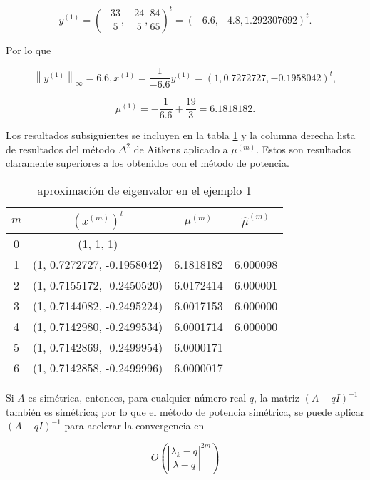 \documentclass[12pt, a4paper]{article}
\numberwithin{subsection}{section} %
\begin{document}
            $$y^{(1)} = (-\frac{33}{5},-\frac{24}{5},\frac{84}{65})^t = (-6.6,-4.8, 1.292307692)^t.$$
        
            Por lo que
        
            $$\left\|y^{(1)}\right\|_{\infty} = 6.6, x^{(1)} = \frac{1}{-6.6}y^{(1)} = (1, 0.7272727,-0.1958042)^t,$$
        
            $$μ^{(1)} = -\frac{1}{6.6} + \frac{19}{3} = 6.1818182.$$
        
            Los resultados subsiguientes se incluyen en la tabla \ref{tab:ej222} y la columna derecha lista de resultados del método $\Delta^2$ de Aitkens aplicado a $\mu^{(m)}$. Estos son resultados claramente superiores a los obtenidos con el método de potencia.
        
            \begin{table}[h!]
                \centering
                \caption{aproximación de eigenvalor en el ejemplo 1}
                \label{tab:ej222}
                \begin{tabular}{|cccc|} \hline
                    $m$ & $(x^{(m)})^t$ & $\mu^{(m)}$ & $\hat{\mu}^{(m)}$ \\ \hline
                    0  &  (1, 1, 1)  & & \\
                    1  &  (1, 0.7272727, -0.1958042)  &  6.1818182 & 6.000098 \\
                    2  &  (1, 0.7155172, -0.2450520)  &  6.0172414 & 6.000001 \\
                    3  &  (1, 0.7144082, -0.2495224)  &  6.0017153 & 6.000000 \\
                    4  &  (1, 0.7142980, -0.2499534)  &  6.0001714 & 6.000000 \\
                    5  &  (1, 0.7142869, -0.2499954)  &  6.0000171 & \\
                    6  &  (1, 0.7142858, -0.2499996)  &  6.0000017 & \\ \hline
                \end{tabular}
            \end{table}

            Si $A$ es simétrica, entonces, para cualquier número real $q$, la matriz $(A-q I)^{-1}$ también es simétrica; por lo que el método de potencia simétrica, se puede aplicar $(A-q I)^{-1}$ para acelerar la convergencia en
        
            $$O\left( \left|\frac{\lambda_k - q}{\lambda - q}\right|^{2m} \right)$$   
\end{document}
